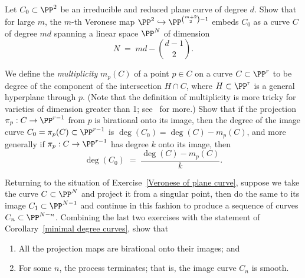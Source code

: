 \begin{exercise}\label{Veronese of plane curve}
Let $C_0 \subset \PP^2$ be an irreducible and reduced plane curve of degree $d$. Show that for large $m$, the $m$-th Veronese map $\PP^2 \hookrightarrow \PP^{\binom{m+2}{2} - 1}$ embeds $C_0$ as a curve $C$ of degree $md$ spanning a linear space $\PP^N$ of dimension
$$
N \; = \; md - \binom{d-1}{2}.
$$
\end{exercise}


\begin{exercise}
We define the \emph{multiplicity} $m_p(C)$ of a point $p \in C$ on a curve $C \subset \PP^r$ to be degree of the component of the intersection $H \cap C$, where $H \subset \PP^r$ is a general hyperplane through $p$. (Note that the definition of multiplicity is more tricky for varieties of dimension greater than 1; see~\cite{3264} for more.) Show that if the projection $\pi_p : C \to \PP^{r-1}$ from $p$ is birational onto its image, then the degree of the image curve $C_0 = \pi_p(C) \subset \PP^{r-1}$ is $\deg(C_0) = \deg(C) - m_p(C)$, and more generally if $\pi_p : C \to \PP^{r-1}$ has degree $k$ onto its image, then
$$
\deg(C_0) \; = \; \frac{\deg(C) - m_p(C)}{k}.
$$
\end{exercise}


\begin{exercise}\label{Mumford resolution argument}
Returning to the situation of Exercise~\ref{Veronese of plane curve}, suppose we take the curve $C \subset \PP^N$ and project it from a singular point, then do the same to its image $C_1 \subset \PP^{N-1}$ and continue in this fashion to produce a sequence of curves $C_n \subset \PP^{N-n}$. Combining the last two exercises with the statement of Corollary~\ref{minimal degree curves}, show that
\begin{enumerate}
\item All the projection maps are birational onto their images; and
\item For some $n$, the process terminates; that is, the image curve $C_n$ is smooth.
\end{enumerate}
\end{exercise}



 